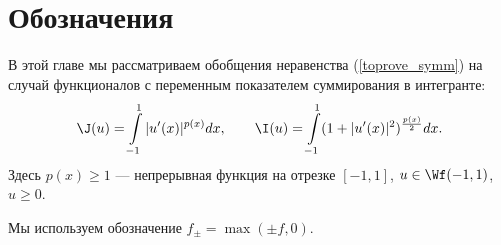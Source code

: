 \section{Обозначения}

В этой главе мы рассматриваем обобщения неравенства (\ref{toprove_symm})
на случай функционалов с переменным показателем суммирования в интегранте:
\begin{equation*}
\J(u) = \int\limits_{-1}^1 |u'(x)|^{p(x)} dx, \qquad \I(u) = \int\limits_{-1}^1 ( 1 + | u'(x) |^2 )^{\frac {p(x)}{2}} dx.
\end{equation*}
Здесь $p(x) \ge 1$ --- непрерывная функция на отрезке $[-1, 1]$, $u \in \Wf(-1, 1)$, $u \ge 0$.

Мы используем обозначение $f_\pm = \max( \pm f, 0 )$.
